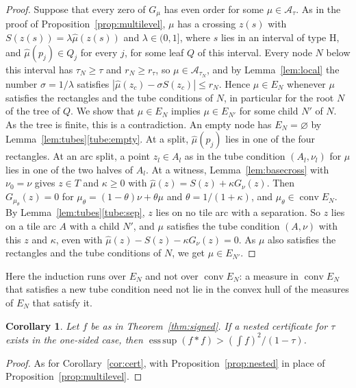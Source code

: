 \documentclass[11pt]{amsart}
\newtheorem{corollary}[theorem]{Corollary}
\theoremstyle{definition}
\theoremstyle{remark}
\numberwithin{equation}{section}
\newcommand{\esssup}{\operatorname*{ess\,sup}}
\begin{document}
\begin{proof}
Suppose that every zero of $G_\mu$ has even order for some $\mu\in\mathcal A_\tau$. As in the proof of Proposition~\ref{prop:multilevel}, $\mu$ has a crossing $z(s)$ with $S(z(s))=\lambda\hat\mu(z(s))$ and $\lambda\in(0,1]$, where $s$ lies in an interval of type H, and $\hat\mu(p_j)\in Q_j$ for every $j$, for some leaf $Q$ of this interval. Every node $N$ below this interval has $\tau_N\ge\tau$ and $r_N\ge r_\tau$, so $\mu\in\mathcal A_{\tau_N}$, and by Lemma~\ref{lem:local} the number $\sigma=1/\lambda$ satisfies $|\hat\mu(z_c)-\sigma S(z_c)|\le r_N$. Hence $\mu\in E_N$ whenever $\mu$ satisfies the rectangles and the tube conditions of $N$, in particular for the root $N$ of the tree of $Q$. We show that $\mu\in E_N$ implies $\mu\in E_{N'}$ for some child $N'$ of $N$. As the tree is finite, this is a contradiction. An empty node has $E_N=\varnothing$ by Lemma~\ref{lem:tubes}\ref{tube:empty}. At a split, $\hat\mu(p_j)$ lies in one of the four rectangles. At an arc split, a point $z_l\in A_l$ as in the tube condition $(A_l,\nu_l)$ for $\mu$ lies in one of the two halves of $A_l$. At a witness, Lemma~\ref{lem:basecross} with $\nu_0=\nu$ gives $z\in T$ and $\kappa\ge0$ with $\hat\mu(z)=S(z)+\kappa G_\nu(z)$. Then $G_{\mu_\theta}(z)=0$ for $\mu_\theta=(1-\theta)\nu+\theta\mu$ and $\theta=1/(1+\kappa)$, and $\mu_\theta\in\operatorname{conv}E_N$. By Lemma~\ref{lem:tubes}\ref{tube:sep}, $z$ lies on no tile arc with a separation. So $z$ lies on a tile arc $A$ with a child $N'$, and $\mu$ satisfies the tube condition $(A,\nu)$ with this $z$ and $\kappa$, even with $\hat\mu(z)-S(z)-\kappa G_\nu(z)=0$. As $\mu$ also satisfies the rectangles and the tube conditions of $N$, we get $\mu\in E_{N'}$.
\end{proof}

Here the induction runs over $E_N$ and not over $\operatorname{conv}E_N$: a measure in $\operatorname{conv}E_N$ that satisfies a new tube condition need not lie in the convex hull of the measures of $E_N$ that satisfy it.

\begin{corollary}\label{cor:nested}
Let $f$ be as in Theorem~\ref{thm:signed}. If a nested certificate for $\tau$ exists in the one-sided case, then $\esssup(f*f)>(\int f)^2/(1-\tau)$.
\end{corollary}

\begin{proof}
As for Corollary~\ref{cor:cert}, with Proposition~\ref{prop:nested} in place of Proposition~\ref{prop:multilevel}.
\end{proof}
\end{document}

